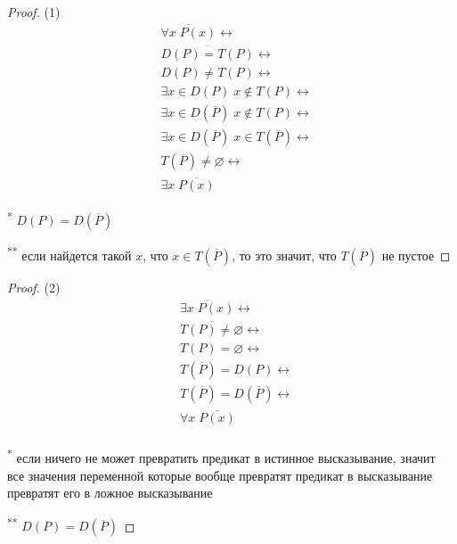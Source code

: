\begin{proof}
    (1) \\
    \begin{align*}
        &\overline{\forall x \; P(x)} \leftrightarrow \\
        &\overline{D(P) = T(P)} \leftrightarrow \\
        &D(P) \ne T(P) \leftrightarrow \\
        &\exists x \in D(P)\;  x \notin T(P) \leftrightarrow \tag{*} \\
        &\exists x \in D(\overline{P})\;  x \notin T(P) \leftrightarrow \\
        &\exists x \in D(\overline{P})\;  x \in T(\overline{P}) \leftrightarrow \tag{**} \\
        &T(\overline{P}) \ne \varnothing \leftrightarrow \\
        &\exists x \; \overline{P(x)}
    \end{align*}

    \textsuperscript{*} $D(P) = D(\overline{P})$

    \textsuperscript{**} если найдется такой $x$, что $x \in T(\overline{P})$, то это значит, что $T(\overline{P})$ не пустое
\end{proof}

\begin{proof}
    (2) \\
    \begin{align*}
        &\overline{\exists x \; P(x)} \leftrightarrow \\
        &\overline{T(P) \ne \varnothing} \leftrightarrow \\
        &T(P) = \varnothing \leftrightarrow \tag{*}\\
        &T(\overline{P}) = D(P) \leftrightarrow \tag{**} \\
        &T(\overline{P}) = D(\overline{P}) \leftrightarrow \\
        &\forall x \; \overline{P(x)}\\
    \end{align*}

    \textsuperscript{*} если ничего не может превратить предикат в истинное высказывание, значит все значения переменной которые вообще превратят предикат 
    в высказывание превратят его в ложное высказывание

    
    \textsuperscript{**} $D(P) = D(\overline{P})$
\end{proof}

\newpage